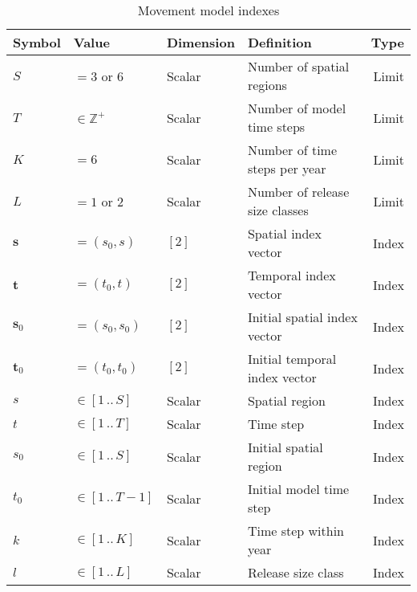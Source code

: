 \documentclass{article}
\begin{document}
\begin{table}[ht]
  \centering
  \caption{Movement model indexes}
  \renewcommand\arraystretch{1.2}
  \label{tab:model-indexes}
  \begin{tabular}{l l l l r}
    \toprule
    \textbf{Symbol} & \textbf{Value} & \textbf{Dimension} & \textbf{Definition} & \textbf{Type} \\
    \toprule
    $S$ & $= 3$ or $6$ & Scalar & Number of spatial regions & Limit \\
    $T$ & $\in \mathbb{Z}^{+}$ & Scalar & Number of model time steps & Limit \\
    $K$ & $= 6$ & Scalar & Number of time steps per year & Limit \\
    $L$ & $= 1$ or $2$ & Scalar & Number of release size classes & Limit \\
    \midrule
    $\boldsymbol{s}$ & $= (s_0, s)$ & $[2]$ & Spatial index vector & Index \\
    $\boldsymbol{t}$ & $= (t_0, t)$ & $[2]$ & Temporal index vector & Index \\
    $\boldsymbol{s}_0$ & $= (s_0, s_0)$ & $[2]$ & Initial spatial index vector & Index \\
    $\boldsymbol{t}_0$ & $= (t_0, t_0)$ & $[2]$ & Initial temporal index vector & Index \\
    \midrule
    $s$ & $\in \left[1 \, .. \, S \right]$ & Scalar & Spatial region & Index \\
    $t$ & $\in \left[1 \, .. \, T \right]$ & Scalar & Time step & Index \\
    $s_0$ & $\in \left[1 \, .. \, S \right]$ & Scalar & Initial spatial region & Index \\
    $t_0$ & $\in \left[1 \, .. \, T \! - \! 1 \right]$ & Scalar & Initial model time step & Index \\
    $k$ & $\in \left[1 \, .. \, K \right]$ & Scalar & Time step within year & Index \\
    $l$ & $\in \left[1 \, .. \, L \right]$ & Scalar & Release size class & Index \\
    \bottomrule
  \end{tabular}
\end{table}
\end{document}
